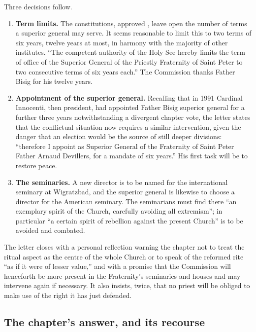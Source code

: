Three decisions follow.

\begin{enumerate}
\item \textbf{Term limits.} The constitutions, approved , leave open the number of terms a superior general may
serve. It seems reasonable to limit this to two terms of six years,
twelve years at most, in harmony with the majority of other institutes.
``The competent authority of the Holy See hereby limits the term of office
of the Superior General of the Priestly Fraternity of Saint Peter to two
consecutive terms of six years each.'' The Commission thanks Father Bisig
for his twelve years.
\item \textbf{Appointment of the superior general.} Recalling that in
1991 Cardinal Innocenti, then president, had appointed Father Bisig
superior general for a further three years notwithstanding a divergent
chapter vote, the letter states that the conflictual situation now
requires a similar intervention, given the danger that an election would
be the source of still deeper divisions: ``therefore I appoint as
Superior General of the Fraternity of Saint Peter Father Arnaud
Devillers, for a mandate of six years.'' His first task will be to
restore peace.
\item \textbf{The seminaries.} A new director is to be named for the
international seminary at Wigratzbad, and the superior general is
likewise to choose a director for the American seminary. The seminarians
must find there ``an exemplary spirit of the Church, carefully avoiding
all extremism''; in particular ``a certain spirit of rebellion against
the present Church'' is to be avoided and combated.
\end{enumerate}

The letter closes with a personal reflection warning the chapter not to
treat the ritual aspect as the centre of the whole Church or to speak of
the reformed rite ``as if it were of lesser value,'' and with a promise
that the Commission will henceforth be more present in the Fraternity's
seminaries and houses and may intervene again if necessary. It also
insists, twice, that no priest will be obliged to make use of the right it
has just defended.

\subsection{The chapter's answer, and its recourse}

